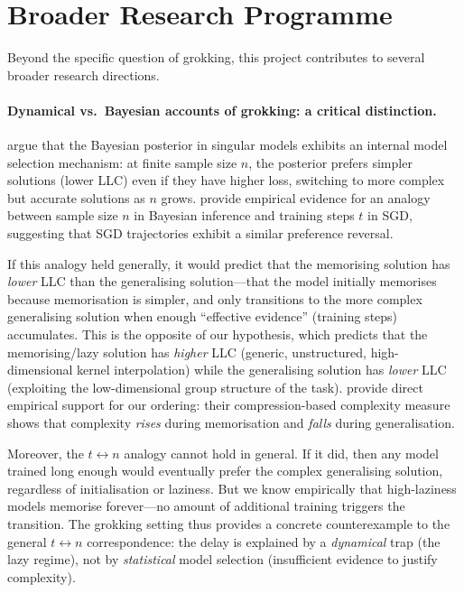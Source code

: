 \documentclass[11pt,a4paper]{article}
\begin{document}
\section{Broader Research Programme}

Beyond the specific question of grokking, this project contributes to several broader research directions.

\paragraph{Dynamical vs.\ Bayesian accounts of grokking: a critical distinction.} \citet{pepinlehalleur2025youare} argue that the Bayesian posterior in singular models exhibits an internal model selection mechanism: at finite sample size $n$, the posterior prefers simpler solutions (lower LLC) even if they have higher loss, switching to more complex but accurate solutions as $n$ grows. \citet{carroll2025incl} provide empirical evidence for an analogy between sample size $n$ in Bayesian inference and training steps $t$ in SGD, suggesting that SGD trajectories exhibit a similar preference reversal.

If this analogy held generally, it would predict that the memorising solution has \emph{lower} LLC than the generalising solution---that the model initially memorises because memorisation is simpler, and only transitions to the more complex generalising solution when enough ``effective evidence'' (training steps) accumulates. This is the opposite of our hypothesis, which predicts that the memorising/lazy solution has \emph{higher} LLC (generic, unstructured, high-dimensional kernel interpolation) while the generalising solution has \emph{lower} LLC (exploiting the low-dimensional group structure of the task). \citet{demoss2025complexity} provide direct empirical support for our ordering: their compression-based complexity measure shows that complexity \emph{rises} during memorisation and \emph{falls} during generalisation.

Moreover, the $t \leftrightarrow n$ analogy cannot hold in general. If it did, then any model trained long enough would eventually prefer the complex generalising solution, regardless of initialisation or laziness. But we know empirically that high-laziness models memorise forever---no amount of additional training triggers the transition. The grokking setting thus provides a concrete counterexample to the general $t \leftrightarrow n$ correspondence: the delay is explained by a \emph{dynamical} trap (the lazy regime), not by \emph{statistical} model selection (insufficient evidence to justify complexity).
\end{document}
